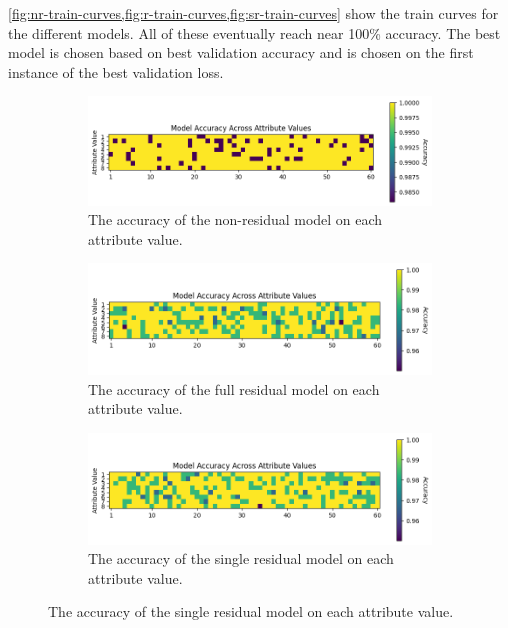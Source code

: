 \cref{fig:nr-train-curves,fig:r-train-curves,fig:sr-train-curves} show the train curves for the different models.
All of these eventually reach near 100\% accuracy.
The best model is chosen based on best validation accuracy and is chosen on the first instance of the best validation loss.

\begin{figure}
    \centering
    \begin{subfigure}{0.9\textwidth}
        \includegraphics[width=\textwidth]{figures/no-residual-accuracy.png}
        \caption{The accuracy of the non-residual model on each attribute value.}
        \label{fig:nr-accuracy}
    \end{subfigure}
    \begin{subfigure}{0.9\textwidth}
        \includegraphics[width=\textwidth]{figures/residual-accuracy.png}
        \caption{The accuracy of the full residual model on each attribute value.}
        \label{fig:r-accuracy}
    \end{subfigure}
    \begin{subfigure}{0.9\textwidth}
        \includegraphics[width=\textwidth]{figures/single-residual-accuracy.png}
        \caption{The accuracy of the single residual model on each attribute value.}
        \label{fig:sr-accuracy}
    \end{subfigure}
\end{figure}

